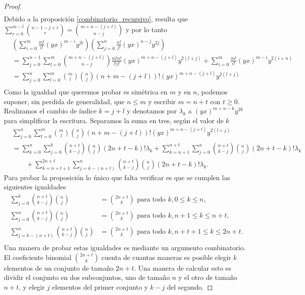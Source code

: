 \documentclass[fleqn,../tesis.tex]{subfiles}
\begin{document}
\begin{proof}
\begin{align*}
	\end{align*}
	Debido a la proposición \ref{combinatorio_recursivo}, resulta que
	$\sum_{r = 0}^{m - l}\binom{n - 1 - j + r}{r} = \binom{m + n - (j + l)}{n - j}$ y por lo tanto
	\begin{align*}
		&\left(\sum_{i = 0}^{m}\frac{m!}{i!}(yx)^{m - i}y^{2i}\right)
			\left(\sum_{j = 0}^{n}\frac{n!}{j!}(yx)^{n - j}y^{2j}\right)\\
		&=\sum_{j = 0}^{n - 1}\sum_{l = 0}^{m}
			\binom{m + n - (j + l)}{n - j}\frac{m!n!}{l!j!}(yx)^{m + n - (j + l)}y^{2(l + j)}
		+ \sum_{i = 0}^{m}\frac{m!}{i!}(yx)^{m - i}y^{2(i + n)}\\
		&= \sum_{j = 0}^{n}\sum_{l = 0}^{m}
			\binom{m}{l}\binom{n}{j}(n + m - (j + l))!(yx)^{m + n - (j + l)}y^{2(l + j)}\\
	\end{align*}
	Como la igualdad que queremos probar es simétrica en $m$ y en $n$, podemos
	suponer, sin perdida de generalidad, que $n \leq m$ y escribir $m = n + t$ con $t \geq 0$.
	Realizamos el cambio de índice $k = j + l$
	y denotamos por $\lambda_k$ a $(yx)^{m + n - k}y^{2k}$ para simplificar la escritura.
	Separamos la suma en tres, según el valor de $k$
	\begin{align*}
		&\sum_{j = 0}^{n}\sum_{l = 0}^{m}
			\binom{m}{l}\binom{n}{j}(n + m - (j + l))!(yx)^{m + n - (j + l)}y^{2(l + j)}\\
		&= \sum_{k = 0}^{n}\sum_{j = 0}^{k}
			\binom{n + t}{k - j}\binom{n}{j}(2n + t -k)!\lambda_k
			 +\sum_{k = n + 1}^{n + t}\sum_{j = 0}^{n}
			\binom{n + t}{k - j}\binom{n}{j}(2n + t -k)!\lambda_k\\
		&\qquad  +\sum_{k = n + t  + 1}^{2n + t}\sum_{j = k - (n + t)}^{n}
			\binom{n + t}{k - j}\binom{n}{j}(2n + t -k)!\lambda_k.
	\end{align*}
	Para probar la proposición lo único que falta verificar es que se cumplen las siguientes igualdades
	\begin{align*}
		\sum_{j = 0}^{k}\binom{n + t}{k - j}\binom{n}{j} &= \binom{2n + t}{k} \text{ para todo }k, 0\leq k \leq n,\\
		\sum_{j = 0}^{n}\binom{n + t}{k - j}\binom{n}{j} &= \binom{2n + t}{k}
			\text{ para todo }k, n + 1 \leq k \leq n + t,\\
		\sum_{j = k - (n + t)}^{n}\binom{n + t}{k - j}\binom{n}{j} &= \binom{2n + t}{k}
			\text{ para todo }k, n + t + 1 \leq k \leq 2n + t.\\
	\end{align*}
	Una manera de probar estas igualdades es mediante un argumento combinatorio.
	El coeficiente binomial $\binom{2n + t}{k}$ cuenta de cuantas maneras es posible elegir
	$k$ elementos de un conjunto de tamaño $2n + t$. Una manera de calcular esto es dividir
	el conjunto en dos subconjuntos, uno de tamaño $n$ y el otro de tamaño $n + t$, y elegir
	$j$ elementos del primer conjunto y $k - j$ del segundo.
\end{proof}
\end{document}
